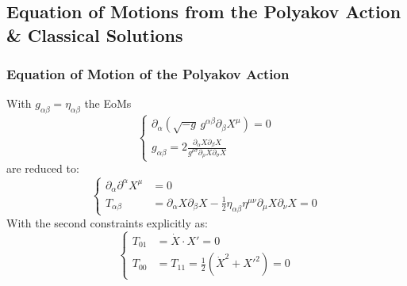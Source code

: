 \documentclass[aspectratio=169]{beamer}
\begin{document}
	\subsection{Equation of Motions from the Polyakov Action \& Classical Solutions}

	\begin{frame}
		\frametitle{Equation of Motion of the Polyakov Action}
		With $g_{\alpha\beta} = \eta_{\alpha\beta}$ the EoMs
		\begin{equation*}
			\begin{cases}
				\partial_\alpha\left(\sqrt{-g}\,g^{\alpha\beta}\partial_\beta X^{\mu}\right) = 0 \\
				g_{\alpha\beta} =  2 \frac{\partial_\alpha X \partial_\beta X}{g^{\rho\sigma}\partial_\rho X \partial_\sigma X}
			\end{cases}
		\end{equation*}
		are reduced to:
		\begin{equation*}
			\begin{cases}
				\partial_\alpha\partial^\alpha X^{\mu} & = 0 \\
				T_{\alpha\beta} &= \partial_\alpha X \partial_\beta X - \frac{1}{2} \eta_{\alpha\beta} \eta^{\mu\nu} \partial_\mu X \partial_\nu X = 0
			\end{cases}
		\end{equation*}
		With the second constraints explicitly as:
		\begin{equation*}
			\begin{cases}
			T_{01} &= \dot{X}\cdot X' = 0 \\
			T_{00} &= T_{11} = \frac{1}{2} \left(\dot{X}^2 + X'^2 \right) = 0
			\end{cases}
		\end{equation*}
	\end{frame}	
\end{document}
